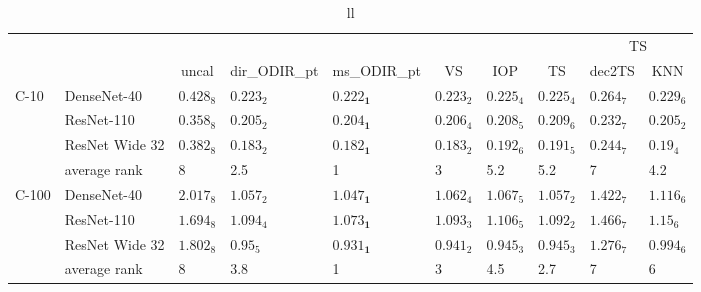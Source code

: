 \begin{table*}
\caption{ll}
\label{table:ll}
\centering
\begin{adjustbox}{width=\textwidth}

\begin{tabular}{llllllllll}
\toprule
\multicolumn{8}{c}{}&\multicolumn{2}{c}{TS}\\
\cmidrule{9-10}
\multicolumn{1}{c}{}&\multicolumn{1}{c}{}&\multicolumn{1}{c}{uncal}&\multicolumn{1}{c}{dir_ODIR_pt}&\multicolumn{1}{c}{ms_ODIR_pt}&\multicolumn{1}{c}{VS}&\multicolumn{1}{c}{IOP}&\multicolumn{1}{c}{TS}&\multicolumn{1}{c}{dec2TS}&\multicolumn{1}{c}{KNN}\\\midrule
C-10 & DenseNet-40 &  $0.428_{8}$ &  $0.223_{2}$ &  $\mathbf{0.222_{1}}$ &  $0.223_{2}$ &  $0.225_{4}$ &  $0.225_{4}$ &  $0.264_{7}$ &  $0.229_{6}$ \\
      & ResNet-110 &  $0.358_{8}$ &  $0.205_{2}$ &  $\mathbf{0.204_{1}}$ &  $0.206_{4}$ &  $0.208_{5}$ &  $0.209_{6}$ &  $0.232_{7}$ &  $0.205_{2}$ \\
      & ResNet Wide 32 &  $0.382_{8}$ &  $0.183_{2}$ &  $\mathbf{0.182_{1}}$ &  $0.183_{2}$ &  $0.192_{6}$ &  $0.191_{5}$ &  $0.244_{7}$ &   $0.19_{4}$ \\
\cmidrule{2-10}
      & average rank &            8 &          2.5 &                     1 &            3 &          5.2 &          5.2 &            7 &          4.2 \\
\cmidrule{1-10}
C-100 & DenseNet-40 &  $2.017_{8}$ &  $1.057_{2}$ &  $\mathbf{1.047_{1}}$ &  $1.062_{4}$ &  $1.067_{5}$ &  $1.057_{2}$ &  $1.422_{7}$ &  $1.116_{6}$ \\
      & ResNet-110 &  $1.694_{8}$ &  $1.094_{4}$ &  $\mathbf{1.073_{1}}$ &  $1.093_{3}$ &  $1.106_{5}$ &  $1.092_{2}$ &  $1.466_{7}$ &   $1.15_{6}$ \\
      & ResNet Wide 32 &  $1.802_{8}$ &   $0.95_{5}$ &  $\mathbf{0.931_{1}}$ &  $0.941_{2}$ &  $0.945_{3}$ &  $0.945_{3}$ &  $1.276_{7}$ &  $0.994_{6}$ \\
\cmidrule{2-10}
      & average rank &            8 &          3.8 &                     1 &            3 &          4.5 &          2.7 &            7 &            6 \\
\bottomrule
\end{tabular}


\end{adjustbox}
\end{table*}